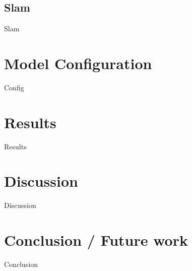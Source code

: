 \documentclass[10pt,journal,compsoc]{IEEEtran}
\begin{document}
\subsection{Slam}
Slam

\section{Model Configuration}
Config 

\section{Results}
Results


\section{Discussion}
Discussion

\section{Conclusion / Future work}
Conclusion
\end{document}
